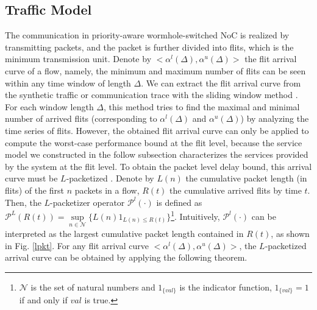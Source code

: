 \documentclass[preprint]{elsarticle}
\begin{document}
\subsection{Traffic Model}\label{traffic}
The communication in priority-aware wormhole-switched NoC is realized by transmitting packets, and the packet is further divided into flits, which is the minimum transmission unit. Denote by $<\alpha^l(\Delta),\alpha^u(\Delta)>$ the flit arrival curve of a flow, namely, the minimum and maximum number of flits can be seen within any time window of length $\Delta$. We can extract the flit arrival curve from the synthetic traffic or communication trace with the sliding window method \cite{1253607}. For each window length $\Delta$, this method tries to find the maximal and minimal number of arrived flits (corresponding to $\alpha^l(\Delta)$ and $\alpha^u(\Delta)$) by analyzing the time series of flits. However, the obtained flit arrival curve can only be applied to compute the worst-case performance bound at the flit level, because the service model we constructed in the follow subsection characterizes the services provided by the system at the flit level. To obtain the packet level delay bound, this arrival curve must be $L$-packetized \cite{Boudec2001Network}. Denote by $L(n)$ the cumulative packet length (in flits) of the first $n$ packets in a flow, $R(t)$ the cumulative arrived flits by time $t$. Then, the $L$-packetizer operator $\mathcal{P}^l(\cdot)$ is defined as $\mathcal{P}^L(R(t))=\underset{n\in\mathcal{N}}{\sup}\{L(n)1_{L(n)\leq R(t)}\}$\footnote{$\mathcal{N}$ is the set of natural numbers and $1_{\{val\}}$ is the indicator function, $1_{\{val\}}=1$ if and only if $val$ is true.}. Intuitively, $\mathcal{P}^l(\cdot)$ can be interpreted as the largest cumulative packet length contained in $R(t)$, as shown in Fig. \ref{lpkt}. For any flit arrival curve $<\alpha^l(\Delta),\alpha^u(\Delta)>$, the $L$-packetized arrival curve can be obtained by applying the following theorem.
\end{document}
